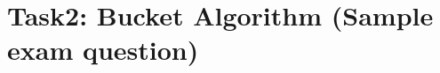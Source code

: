 \documentclass{scrartcl}
\begin{document}
	\section*{Task2: Bucket Algorithm (Sample exam question)}
	\begin{center}
	\end{center}
\end{document}

